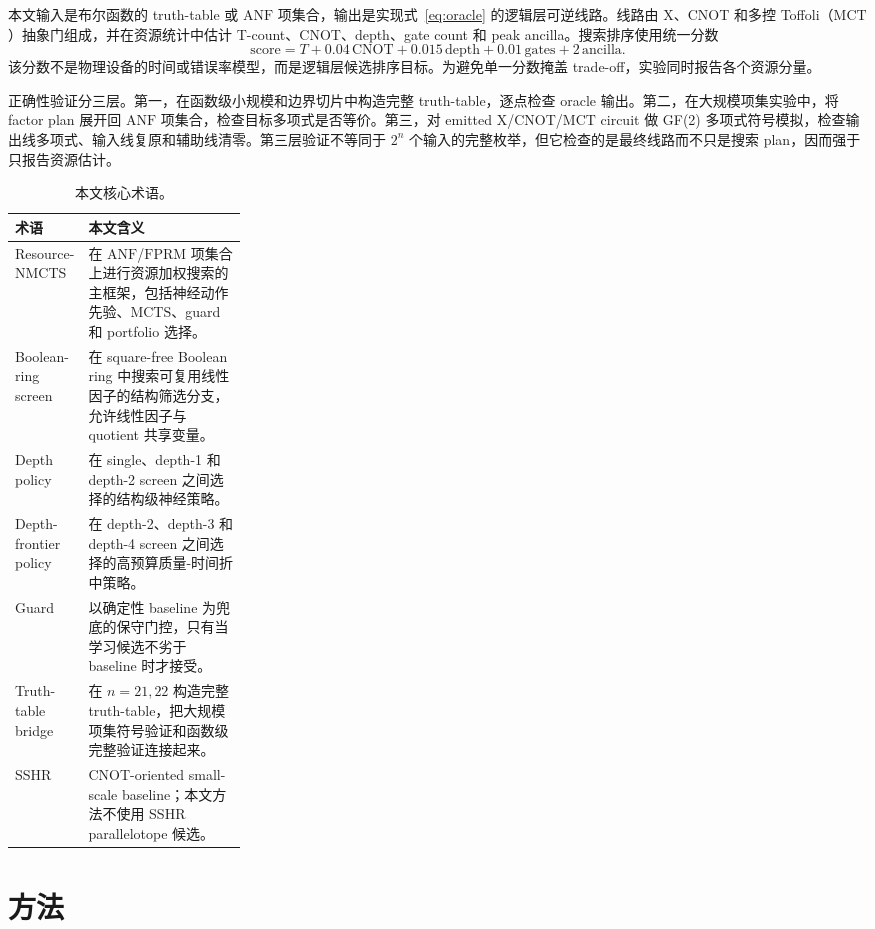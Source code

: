 \documentclass[UTF8,fontset=macnew,11pt]{ctexart}
\newcommand{\method}{Resource-NMCTS}
\newcommand{\screen}{Boolean-ring screen}
\newcommand{\anf}{\ensuremath{\mathrm{ANF}}}
\newcommand{\fprm}{\ensuremath{\mathrm{FPRM}}}
\newcommand{\mcts}{\ensuremath{\mathrm{MCTS}}}
\newcommand{\score}{\ensuremath{\mathrm{score}}}
\newcommand{\ttable}{truth-table}
\newcommand{\mct}{\ensuremath{\mathrm{MCT}}}
\begin{document}
本文输入是布尔函数的 \ttable{} 或 \anf{} 项集合，输出是实现式~\eqref{eq:oracle} 的逻辑层可逆线路。线路由 X、CNOT 和多控 Toffoli（\mct{}）抽象门组成，并在资源统计中估计 T-count、CNOT、depth、gate count 和 peak ancilla。搜索排序使用统一分数
\begin{equation}
  \score = T + 0.04\,\mathrm{CNOT} + 0.015\,\mathrm{depth}
         + 0.01\,\mathrm{gates} + 2\,\mathrm{ancilla}.
  \label{eq:score}
\end{equation}
该分数不是物理设备的时间或错误率模型，而是逻辑层候选排序目标。为避免单一分数掩盖 trade-off，实验同时报告各个资源分量。

正确性验证分三层。第一，在函数级小规模和边界切片中构造完整 \ttable{}，逐点检查 oracle 输出。第二，在大规模项集实验中，将 factor plan 展开回 \anf{} 项集合，检查目标多项式是否等价。第三，对 emitted X/CNOT/\mct{} circuit 做 GF(2) 多项式符号模拟，检查输出线多项式、输入线复原和辅助线清零。第三层验证不等同于 $2^n$ 个输入的完整枚举，但它检查的是最终线路而不只是搜索 plan，因而强于只报告资源估计。

\begin{table}[H]
\centering
\small
\caption{本文核心术语。}
\label{tab:terms}
\begin{tabularx}{\linewidth}{>{\raggedright\arraybackslash}p{0.27\linewidth}>{\raggedright\arraybackslash}X}
\toprule
术语 & 本文含义 \\
\midrule
\method{} & 在 \anf{}/\fprm{} 项集合上进行资源加权搜索的主框架，包括神经动作先验、\mcts{}、guard 和 portfolio 选择。 \\
\screen{} & 在 square-free Boolean ring 中搜索可复用线性因子的结构筛选分支，允许线性因子与 quotient 共享变量。 \\
Depth policy & 在 single、depth-1 和 depth-2 screen 之间选择的结构级神经策略。 \\
Depth-frontier policy & 在 depth-2、depth-3 和 depth-4 screen 之间选择的高预算质量-时间折中策略。 \\
Guard & 以确定性 baseline 为兜底的保守门控，只有当学习候选不劣于 baseline 时才接受。 \\
Truth-table bridge & 在 $n=21,22$ 构造完整 \ttable{}，把大规模项集符号验证和函数级完整验证连接起来。 \\
SSHR & CNOT-oriented small-scale baseline；本文方法不使用 SSHR parallelotope 候选。 \\
\bottomrule
\end{tabularx}
\end{table}

\section{方法}
\end{document}
